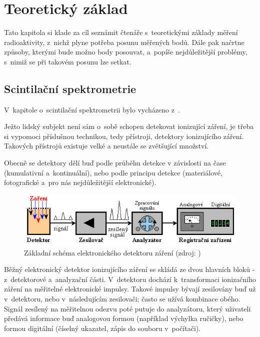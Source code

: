 \chapter{Teoretický základ}
\label{2-teorie}

Tato kapitola si klade za cíl seznámit čtenáře s~teoretickými základy měření radioaktivity, z~nichž
plyne potřeba posunu měřených bodů. Dále pak načrtne způsoby, kterými bude možno body posouvat, a~popíše
nejdůležitější problémy, s~nimiž se při takovém posunu lze setkat. 


\section{Scintilační spektrometrie}
\label{spektrometrie}

V~kapitole o~scintilační spektrometrii bylo vycházeno z~\citep{spektrometrie}. 

Ježto lidský subjekt není sám o~sobě schopen detekovat ionizující záření, je třeba si vypomoci příslušnou
technikou, tedy přístroji, detektory ionizujícího záření. Tako\-vých přístrojů existuje velké
a neustále se zvětšující množství. 

Obecně se detektory dělí buď podle průběhu detekce v závislosti na čase (kumulativní a~kontinuální),
nebo podle principu detekce (materiálové, fotografické a~pro nás nejdůležitější elektronické). 

  \begin{figure}[H]
   \centering
	\includegraphics{./pictures/elektronicky-detektor.png}
	\caption[Základní schéma elektronického detektoru záření]{Základní schéma elektronického
	detektoru záření
	(zdroj: \cite{spektrometrie})}
      \label{fig:elektronicky-detektor}
  \end{figure}

Běžný elektronický detektor ionizujícího záření se skládá ze dvou hlavních bloků - z~detektorové
a~analyzační části. V~detektoru dochází k~transformaci ionizačního záření na měřitelné
elektronické impulsy. Takové impulsy bývají zesilovány buď už v~detektoru, nebo v~následujícím
zesilovači; často se užívá kombinace obého. Signál zesílený na měřitelnou odezvu poté putuje do
analyzátoru, který uživateli předává informace buď analogovou formou (například výchylka ručičky),
nebo formou di\-gitální (číselný ukazatel, zápis do souboru v~počítači). 

